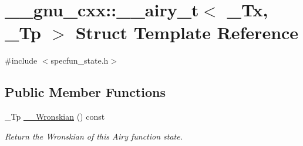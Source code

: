 \hypertarget{struct____gnu__cxx_1_1____airy__t}{}\section{\+\_\+\+\_\+gnu\+\_\+cxx\+:\+:\+\_\+\+\_\+airy\+\_\+t$<$ \+\_\+\+Tx, \+\_\+\+Tp $>$ Struct Template Reference}
\label{struct____gnu__cxx_1_1____airy__t}


{\ttfamily \#include $<$specfun\+\_\+state.\+h$>$}

\subsection*{Public Member Functions}
\begin{DoxyCompactItemize}
\item 
\+\_\+\+Tp \hyperlink{struct____gnu__cxx_1_1____airy__t_a746df47deb6d6c39b83068113cde301b}{\+\_\+\+\_\+\+Wronskian} () const
\begin{DoxyCompactList}\small\item\em Return the Wronskian of this Airy function state. \end{DoxyCompactList}\end{DoxyCompactItemize}

